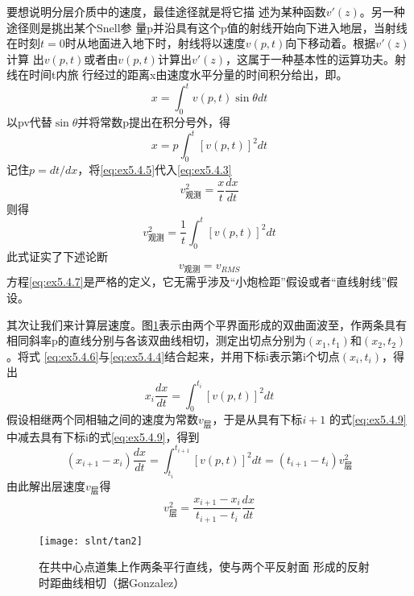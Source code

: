 要想说明分层介质中的速度，最佳途径就是将它描
述为某种函数$v'(z)$。另一种途径则是挑出某个Snell参
量p并沿具有这个p值的射线开始向下进入地层，当射线
在时刻$t=0$时从地面进入地下时，射线将以速度$v(p,t)$向下移动着。根据$v'(z)$计算
出$v(p,t)$或者由$v(p,t)$计算出$v'(z)$，这属于一种基本性的运算功夫。射线在时间t内旅
行经过的距离x由速度水平分量的时间积分给出，即。
\begin{equation}
x=\int_0^t v(p,t)\sin\theta dt
\label{eq:ex5.4.4}
\end{equation}
以pv代替$\sin\theta$并将常数p提出在积分号外，得
\begin{equation}
x=p\int_0^t[v(p,t)]^2dt
\label{eq:ex5.4.5}
\end{equation}
记住$p=dt/dx$，将\ref{eq:ex5.4.5}代入\ref{eq:ex5.4.3}
\begin{equation}
v_{观测}^2=\frac{x}{t}\frac{dx}{dt}
\label{eq:ex5.4.6}
\end{equation}
则得
\begin{equation}
v_{观测}^2=\frac{1}{t}\int_0^t[v(p,t)]^2dt
\label{eq:ex5.4.7}
\end{equation}
此式证实了下述论断
\begin{equation}
v_{观测}=v_{RMS}
\label{eq:ex5.4.8}
\end{equation}
方程\ref{eq:ex5.4.7}是严格的定义，它无需乎涉及“小炮检距”假设或者“直线射线”假设。

其次让我们来计算层速度。图\ref{fig:slnt/tan2}表示由两个平界面形成的双曲面波至，作两条具有
相同斜率p的直线分别与各该双曲线相切，测定出切点分别为$(x_1,t_1)$和$(x_2,t_2)$。将式
\ref{eq:ex5.4.6}与\ref{eq:ex5.4.4}结合起来，并用下标i表示第i个切点$(x_i,t_i)$，得出
\begin{equation}
x_i\frac{dx}{dt}=\int_0^{t_i}[v(p,t)]^2dt
\label{eq:ex5.4.9}
\end{equation}
假设相继两个同相轴之间的速度为常数$v_{\text{层}}$，于是从具有下标$i+1$
的式\ref{eq:ex5.4.9}中减去具有下标i的式\ref{eq:ex5.4.9}，得到
\begin{equation}
(x_{i+1}-x_i)\frac{dx}{dt}=\int_{t_i}^{t_{i+1}}[v(p,t)]^2dt=
(t_{i+1}-t_i)v_{\text{层}}^2
\label{eq:ex5.4.10}
\end{equation}
由此解出层速度$v_{\text{层}}$得
\begin{equation}
v_{\text{层}}^2=\frac{x_{i+1}-x_i}{t_{i+1}-t_i}\frac{dx}{dt}
\label{eq:ex5.4.11}
\end{equation}



\begin{figure}[H]
\centering
\texttt{[image: slnt/tan2]}
\caption[tan2]{在共中心点道集上作两条平行直线，使与两个平反射面
形成的反射时距曲线相切（据Gonzalez）
}
\label{fig:slnt/tan2}
\end{figure}

